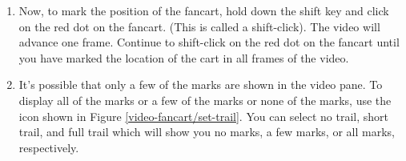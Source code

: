\begin{enumerate}
	\item Now, to mark the position of the fancart, hold down the shift key and click on the red dot on the fancart. (This is called a shift-click). The video will advance one frame. Continue to shift-click on the red dot on the fancart until you have marked the location of the cart in all frames of the video.
		
		\item It's possible that only a few of the marks are shown in the video pane. To display all of the marks or a few of the marks or none of the marks, use the  icon shown in Figure \ref{video-fancart/set-trail}. You can select no trail, short trail, and full trail which will show you no marks, a few marks, or all marks, respectively. 


	
\end{enumerate}

\analysis	

